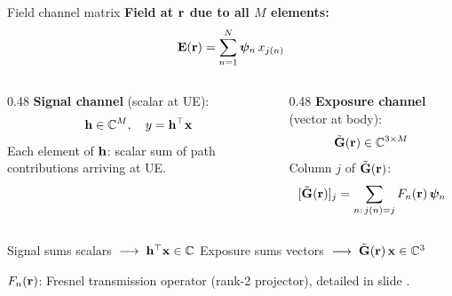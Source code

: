 \begin{frame}[label=app-p3-G]{Field channel matrix}
  {\small \textbf{Field at $\mathbf{r}$ due to all $M$ elements:}}
  \vspace{-2pt}
  \[
    \mathbf{E}(\mathbf{r}) = \sum_{n=1}^{N} \bm{\psi}_n \, x_{j(n)}
  \]
  \vspace{-2pt}
  \begin{columns}[T]
    \begin{column}{0.48\textwidth}
      \textbf{Signal channel} (scalar at UE):
      \[
        \mathbf{h} \in \mathbb{C}^M, \quad y = \mathbf{h}^\top \mathbf{x}
      \]
      Each element of $\mathbf{h}$: scalar sum of path contributions arriving at UE.
    \end{column}

    \begin{column}{0.48\textwidth}
      \textbf{Exposure channel} (vector at body):
      \[
        \tilde{\mathbf{G}}(\mathbf{r}) \in \mathbb{C}^{3 \times M}
      \]
      Column $j$ of $\tilde{\mathbf{G}}(\mathbf{r})$:
      \[
        [\tilde{\mathbf{G}}(\mathbf{r})]_j = \sum_{\substack{n:\, j(n)=j}} F_n(\mathbf{r})\,\bm{\psi}_n
      \]
    \end{column}
  \end{columns}

  \vspace{-2pt}
  \begin{resultbox}
    \vspace{-4pt}
    \begin{center}
      Signal sums scalars $\;\longrightarrow\; \mathbf{h}^\top\mathbf{x} \in \mathbb{C}$
      \qquad\qquad
      Exposure sums vectors $\;\longrightarrow\; \tilde{\mathbf{G}}(\mathbf{r})\,\mathbf{x} \in \mathbb{C}^3$
    \end{center}
  \end{resultbox}
  \vspace{-2pt}
  {\footnotesize $F_n(\mathbf{r})$: Fresnel transmission operator (rank-2 projector), detailed in slide \hyperlink{app-p3-fresnel-op}{}.}
  \vspace{-4pt}
\end{frame}

